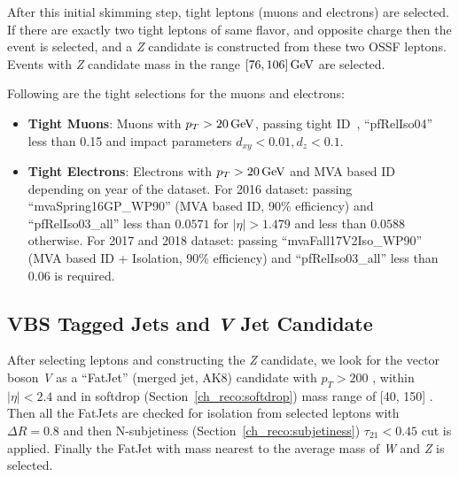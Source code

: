 After this initial skimming step, tight leptons (muons and electrons) are
selected. If there are exactly two tight leptons
of same flavor, and opposite charge then the event is selected,
and a \textit{Z} candidate is constructed from these two \gls{OSSF} leptons.
Events with \textit{Z} candidate mass in the range \( [76, 106] \,\text{Ge\hspace{-.08em}V}{} \) are selected.

Following are the tight selections for the muons and electrons:
\begin{itemize}
  \item \textbf{Tight Muons}: Muons with \( p_T > 20 \,\text{Ge\hspace{-.08em}V}{} \), passing
        tight ID~\cite{cms-muon-id}, ``pfRelIso04'' less than 0.15 and
        impact parameters \( d_{xy} < 0.01, d_z < 0.1 \).
  \item \textbf{Tight Electrons}: Electrons with \( p_T > 20 \,\text{Ge\hspace{-.08em}V} \)
        and MVA based ID depending on year of the dataset.
        For 2016 dataset: passing ``mvaSpring16GP\_WP90'' (MVA based ID, 90\% efficiency)
        and ``pfRelIso03\_all'' less than \( 0.0571 \) for
        \( |\eta| > 1.479 \) and less than \( 0.0588 \) otherwise.
        For 2017 and 2018 dataset: passing ``mvaFall17V2Iso\_WP90''
        (MVA based ID + Isolation, 90\% efficiency) and ``pfRelIso03\_all''
        less than \( 0.06 \) is required.
\end{itemize}

\subsection{
  VBS Tagged Jets and \textit{V} Jet Candidate
}
After selecting leptons and constructing the \textit{Z} candidate, we look
for the vector boson \textit{V} as a ``FatJet'' (merged jet, AK8) candidate with \( p_T > 200 \) \GeV{},
within \( |\eta| < 2.4 \) and in softdrop (Section~\ref{ch_reco:softdrop}) mass range of [40, 150] \GeV{}.
Then all the FatJets are checked for isolation from
selected leptons with \( \Delta R = 0.8 \)
and then N-subjetiness (Section~\ref{ch_reco:subjetiness}) \( \tau_{21} < 0.45 \) cut is applied.
Finally the FatJet with mass nearest to the average mass of \textit{W} and \textit{Z}
is selected.

